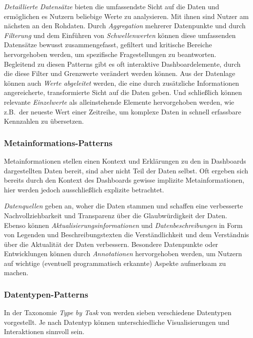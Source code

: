 \emph{Detaillierte Datensätze} bieten die umfassendste Sicht auf die Daten und ermöglichen es Nutzern beliebige Werte zu analysieren.
Mit ihnen sind Nutzer am nächsten an den Rohdaten.
Durch \emph{Aggregation} mehrerer Datenpunkte und durch \emph{Filterung} und dem Einführen von \emph{Schwellenwerten} können diese umfassenden Datensätze bewusst zusammengefasst, gefiltert und kritische Bereiche hervorgehoben werden, um spezifische Fragestellungen zu beantworten.
Begleitend zu diesen Patterns gibt es oft interaktive Dashboardelemente, durch die diese Filter und Grenzwerte verändert werden können.
Aus der Datenlage können auch \emph{Werte abgeleitet} werden, die eine durch zusätzliche Informationen angereicherte, transformierte Sicht auf die Daten geben.
Und schließlich können relevante \emph{Einzelwerte} als alleinstehende Elemente hervorgehoben werden, wie z.B.\ der neueste Wert einer Zeitreihe, um komplexe Daten in schnell erfassbare Kennzahlen zu übersetzen.

\subsubsection{Metainformations-Patterns}\label{subsubsec:meta-information-patterns}

\autocite[S. 3]{Bach.DashboardDesignPatterns.2023} Metainformationen stellen einen Kontext und Erklärungen zu den in Dashboards dargestellten Daten bereit, sind aber nicht Teil der Daten selbst.
Oft ergeben sich bereits durch den Kontext des Dashboards gewisse implizite Metainformationen, hier werden jedoch ausschließlich explizite betrachtet.

\emph{Datenquellen} geben an, woher die Daten stammen und schaffen eine verbesserte Nachvollziehbarkeit und Transparenz über die Glaubwürdigkeit der Daten.
Ebenso können \emph{Aktualisierungsinformationen} und \emph{Datenbeschreibungen} in Form von Legenden und Beschreibungstexten die Verständlichkeit und dem Verständnis über die Aktualität der Daten verbessern.
Besondere Datenpunkte oder Entwicklungen können durch \emph{Annotationen} hervorgehoben werden, um Nutzern auf wichtige (eventuell programmatisch erkannte) Aspekte aufmerksam zu machen.

\subsubsection{Datentypen-Patterns}

In der Taxonomie \emph{Type by Task} von \autocite[S. 2--5]{Shneiderman.TheEyesHaveIt.1996} werden sieben verschiedene Datentypen vorgestellt.
Je nach Datentyp können unterschiedliche Visualisierungen und Interaktionen sinnvoll sein.

